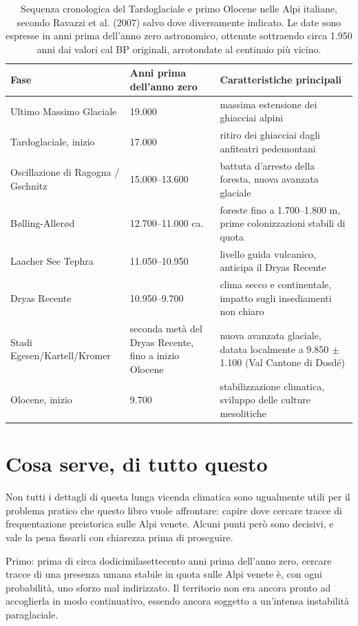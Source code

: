 \begin{table}[htbp]
\centering
\small
\begin{tabular}{@{}p{3.4cm}p{2.6cm}p{5.4cm}@{}}
\toprule
\textbf{Fase} & \textbf{Anni prima dell'anno zero} & \textbf{Caratteristiche principali} \\
\midrule
Ultimo Massimo Glaciale & 19.000 & massima estensione dei ghiacciai alpini \\
Tardoglaciale, inizio & 17.000 & ritiro dei ghiacciai dagli anfiteatri pedemontani \\
Oscillazione di Ragogna / Gschnitz & 15.000--13.600 & battuta d'arresto della foresta, nuova avanzata glaciale \\
Bølling-Allerød & 12.700--11.000 ca. & foreste fino a 1.700--1.800 m, prime colonizzazioni stabili di quota \\
Laacher See Tephra & 11.050--10.950 & livello guida vulcanico, anticipa il Dryas Recente \\
Dryas Recente & 10.950--9.700 & clima secco e continentale, impatto sugli insediamenti non chiaro \\
Stadi Egesen/Kartell/Kromer & seconda metà del Dryas Recente, fino a inizio Olocene & nuova avanzata glaciale, datata localmente a 9.850 $\pm$ 1.100 (Val Cantone di Dosdé) \\
Olocene, inizio & 9.700 & stabilizzazione climatica, sviluppo delle culture mesolitiche \\
\bottomrule
\end{tabular}
\caption{Sequenza cronologica del Tardoglaciale e primo Olocene nelle Alpi italiane, secondo Ravazzi et al. (2007) salvo dove diversamente indicato. Le date sono espresse in anni prima dell'anno zero astronomico, ottenute sottraendo circa 1.950 anni dai valori cal BP originali, arrotondate al centinaio più vicino.}
\label{tab:cronologia}
\end{table}

\section{Cosa serve, di tutto questo}

Non tutti i dettagli di questa lunga vicenda climatica sono ugualmente utili per il problema pratico che questo libro vuole affrontare: capire dove cercare tracce di frequentazione preistorica sulle Alpi venete. Alcuni punti però sono decisivi, e vale la pena fissarli con chiarezza prima di proseguire.

Primo: prima di circa dodicimilasettecento anni prima dell'anno zero, cercare tracce di una presenza umana stabile in quota sulle Alpi venete è, con ogni probabilità, uno sforzo mal indirizzato. Il territorio non era ancora pronto ad accoglierla in modo continuativo, essendo ancora soggetto a un'intensa instabilità paraglaciale.


